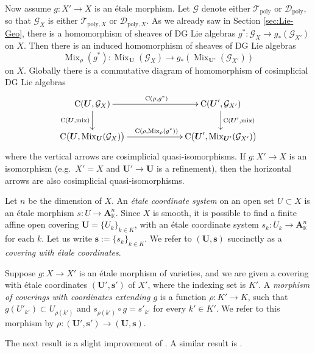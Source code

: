 \documentclass[a4paper, 10pt]{amsart}
\theoremstyle{definition}
\numberwithin{equation}{section}
\newcommand{\opn}{\operatorname}
\newcommand{\mcal}[1]{\mathcal{#1}}
\newcommand{\mbf}[1]{\mathbf{#1}}
\newcommand{\mrm}[1]{\mathrm{#1}}
\newcommand{\mbb}[1]{\mathbb{#1}}
\newcommand{\bsym}[1]{\boldsymbol{#1}}
\newcommand{\K}{\mbb{K}}
\begin{document}
Now assume $g : X' \to X$ is an \'etale morphism. Let $\mcal{G}$ denote either 
$\mcal{T}_{\mrm{poly}}$ or $\mcal{D}_{\mrm{poly}}$, so that 
$\mcal{G}_X$ is either $\mcal{T}_{\mrm{poly}, X}$ or
$\mcal{D}_{\mrm{poly}, X}$.
As we already saw in Section \ref{sec:Lie-Geo}, there is a homomorphism of 
sheaves of DG Lie algebras 
$g^* : \mcal{G}_X \to g_* (\mcal{G}_{X'})$ on $X$.  
Then there is an induced homomorphism of sheaves of DG Lie algebras
\[ \opn{Mix}_{\rho}(g^*) : \opn{Mix}_{\bsym{U}}(\mcal{G}_{X}) \to 
g_* (\opn{Mix}_{\bsym{U}'}(\mcal{G}_{X'})) \]
on $X$. Globally there is a commutative diagram of homomorphism of cosimplicial
DG Lie algebras
\begin{equation} \label{eqn:TDQ.101}
\UseTips \xymatrix @C=15ex @R=5ex {
\opn{C}(\bsym{U}, \mcal{G}_{X})
\ar[r]^{\opn{C}(\rho, g^*)}
\ar[d]_{\opn{C}(\bsym{U}, \opn{mix})}
&
\opn{C}(\bsym{U}', \mcal{G}_{X'})
\ar[d]^{\opn{C}(\bsym{U}', \opn{mix})}
\\
\opn{C} \bigl( \bsym{U}, \opn{Mix}_{\bsym{U}}(\mcal{G}_{X}) \bigr)
\ar[r]^{\opn{C}(\rho, \opn{Mix}_{\rho}(g^*))}
&
\opn{C} \bigl( \bsym{U}', \opn{Mix}_{\bsym{U}'}(\mcal{G}_{X'}) \bigr)
}
\end{equation}
where the vertical arrows are cosimplicial quasi-isomorphisms.
If $g : X' \to X$ is an isomorphism (e.g.\ $X' = X$ and 
$\bsym{U}' \to \bsym{U}$ is a refinement), then the horizontal arrows are also 
cosimplicial quasi-isomorphisms.

Let $n$ be the dimension of $X$.
An {\em \'etale coordinate system} on an open set $U \subset X$ is 
an \'etale morphism $s : U \to \mbf{A}^n_{\K}$.
Since $X$ is smooth, it is possible to find a
finite affine open covering 
$\bsym{U} = \{U_k \}_{k \in K}$, with an \'etale coordinate system
$s_k : U_k \to \mbf{A}^n_{\K}$ for each $k$. Let us write
$\bsym{s} := \{s_k \}_{k \in K}$. We refer to
$(\bsym{U}, \bsym{s})$ succinctly as a {\em covering with \'etale coordinates}.

Suppose $g : X \to X'$ is an \'etale morphism of varieties, and we are given a
covering with \'etale coordinates
$(\bsym{U}', \bsym{s}')$ of $X'$, where the indexing set is $K'$. A {\em
morphism of coverings with coordinates
extending $g$} is a function 
$\rho : K' \to K$,
such that $g(U'_{k'}) \subset U_{\rho(k')}$ and
$s_{\rho(k')} \circ g = s'_{k'}$ for every $k' \in K'$.
We refer to this morphism by 
$\rho : (\bsym{U}', \bsym{s}') \to (\bsym{U}, \bsym{s})$. 

The next result is a slight improvement of \cite[Theorem 0.2]{Ye1}. 
A similar result is \cite[Theorem 1.1]{VdB}.
\end{document}
